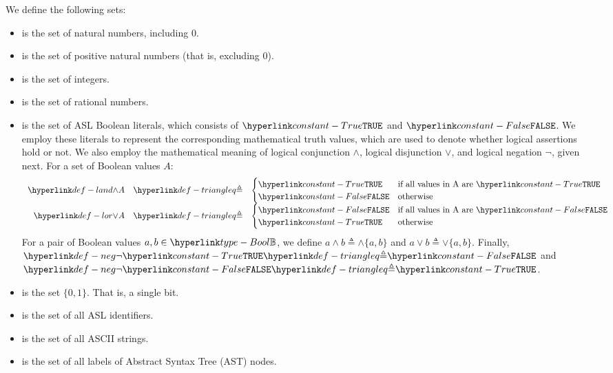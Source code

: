 We define the following sets:
\begin{itemize}
\item {} is the set of natural numbers, including $0$.

\item {} is the set of positive natural numbers (that is, excluding $0$).

\item {}
is the set of integers.

\item {}
is the set of rational numbers.

\hypertarget{constant-False}{}
\hypertarget{constant-True}{}
\item {}
is the set of ASL Boolean literals, which consists of $\True$ and $\False$.
We employ these literals to represent the corresponding mathematical truth values,
which are used to denote whether logical assertions hold or not.
\hypertarget{def-land}{}
\hypertarget{def-lor}{}
We also employ the mathematical meaning of logical conjunction $\land$, logical disjunction $\lor$,
and logical negation $\neg$, given next.
For a set of Boolean values $A$:
\[
  \begin{array}{rcl}
  \land A &\triangleq&
  \begin{cases}
    \True & \text{if all values in A are }\True\\
    \False & \text{otherwise}
  \end{cases}\\
  \lor A &\triangleq&
  \begin{cases}
    \False & \text{if all values in A are }\False\\
    \True & \text{otherwise}
  \end{cases}\\
\end{array}
\]
\hypertarget{def-neg}{}
For a pair of Boolean values $a,b\in\Bool$, we define $a \land b \triangleq \land\{a, b\}$
and $a \lor b \triangleq \lor\{a, b\}$.
Finally, $\neg\True\triangleq\False$ and $\neg\False\triangleq\True$.

\item {}
is the set $\{0,1\}$. That is, a single bit.

\item {}
is the set of all ASL identifiers.

\item {}
is the set of all ASCII strings.

\item {}
is the set of all labels of Abstract Syntax Tree (AST) nodes.
\end{itemize}

